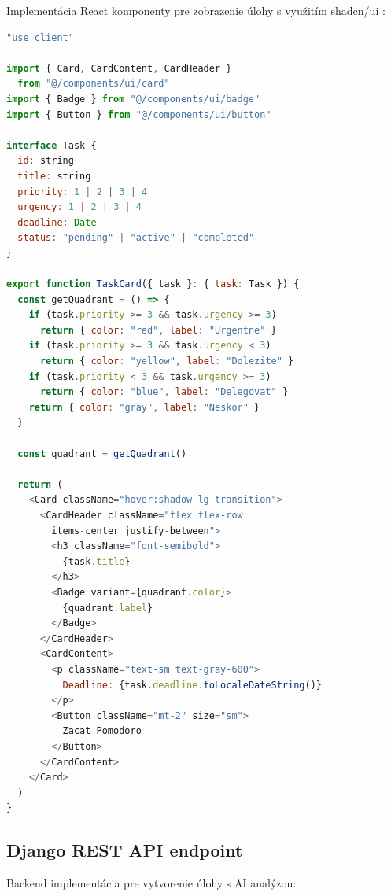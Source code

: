 \documentclass[10pt,twocolumn,twoside,slovak,a4paper]{article}
\begin{document}
Implementácia React komponenty pre zobrazenie úlohy s využitím shadcn/ui \cite{shadcn-ui}:

\begin{lstlisting}[language=JavaScript, caption=TaskCard komponent s Eisenhower prioritou]
"use client"

import { Card, CardContent, CardHeader } 
  from "@/components/ui/card"
import { Badge } from "@/components/ui/badge"
import { Button } from "@/components/ui/button"

interface Task {
  id: string
  title: string
  priority: 1 | 2 | 3 | 4
  urgency: 1 | 2 | 3 | 4
  deadline: Date
  status: "pending" | "active" | "completed"
}

export function TaskCard({ task }: { task: Task }) {
  const getQuadrant = () => {
    if (task.priority >= 3 && task.urgency >= 3)
      return { color: "red", label: "Urgentne" }
    if (task.priority >= 3 && task.urgency < 3)
      return { color: "yellow", label: "Dolezite" }
    if (task.priority < 3 && task.urgency >= 3)
      return { color: "blue", label: "Delegovat" }
    return { color: "gray", label: "Neskor" }
  }

  const quadrant = getQuadrant()

  return (
    <Card className="hover:shadow-lg transition">
      <CardHeader className="flex flex-row 
        items-center justify-between">
        <h3 className="font-semibold">
          {task.title}
        </h3>
        <Badge variant={quadrant.color}>
          {quadrant.label}
        </Badge>
      </CardHeader>
      <CardContent>
        <p className="text-sm text-gray-600">
          Deadline: {task.deadline.toLocaleDateString()}
        </p>
        <Button className="mt-2" size="sm">
          Zacat Pomodoro
        </Button>
      </CardContent>
    </Card>
  )
}
\end{lstlisting}

\subsection{Django REST API endpoint}

Backend implementácia pre vytvorenie úlohy s AI analýzou:
\end{document}
